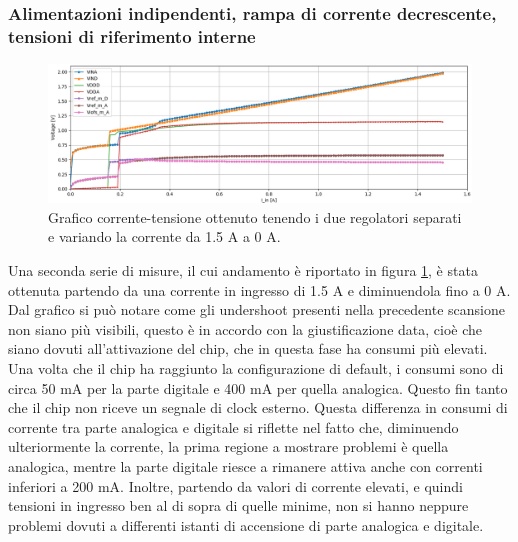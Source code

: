 \subsubsection{Alimentazioni indipendenti, rampa di corrente decrescente, tensioni di riferimento interne}
\begin{figure}
\centering
\includegraphics[width=\textwidth]{Immagini/IDI2}
\caption{Grafico corrente-tensione ottenuto tenendo i due regolatori separati e variando la corrente da 1.5 A a 0 A.}
\label{IDI}
\end{figure}

Una seconda serie di misure, il cui andamento è riportato in figura \ref{IDI}, è stata ottenuta partendo da una corrente in ingresso di 1.5 A e diminuendola fino a 0 A. 
Dal grafico si può notare come gli undershoot presenti nella precedente scansione non siano più visibili, questo è in accordo con la giustificazione data, cioè che siano dovuti all'attivazione del chip, che in questa fase ha consumi più elevati. 
Una volta che il chip ha raggiunto la configurazione di default, i consumi sono di circa 50 mA per la parte digitale e 400 mA per quella analogica. Questo fin tanto che il chip non riceve un segnale di clock esterno. 
Questa differenza in consumi di corrente tra parte analogica e digitale si riflette nel fatto che, diminuendo ulteriormente la corrente, la prima regione a mostrare problemi è quella analogica, mentre la parte digitale riesce a rimanere attiva anche con correnti inferiori a 200 mA. 
Inoltre, partendo da valori di corrente elevati, e quindi tensioni in ingresso ben al di sopra di quelle minime, non si hanno neppure problemi dovuti a differenti istanti di accensione di parte analogica e digitale.
% 
%
%

